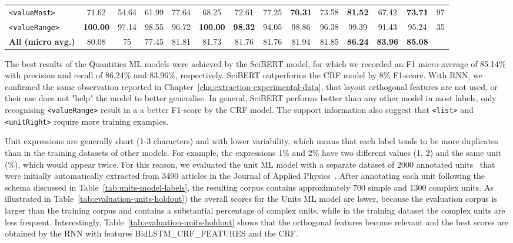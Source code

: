 \begin{table}[htbp]
{\begin{tabular}{l ccc ccc ccc ccc r}
        \texttt{<valueMost>} & 71.62 & 54.64 & 61.99 & 77.64 & 68.25 & 72.61 & 77.25 & \textbf{70.31} & 73.58 & \textbf{81.52} & 67.42 & \textbf{73.71} & 97\\
        \texttt{<valueRange>} & \textbf{100.00} & 97.14 & 98.55 & 96.72 & \textbf{100.00} & \textbf{98.32} & 94.05 & 98.86 & 96.38 & 99.39 & 91.43 & 95.24 & 35\\
        \midrule
        \textbf{All (micro avg.)} & 80.08 & 75 & 77.45 & 81.81 & 81.73 & 81.76 & 81.76 & 81.94 & 81.85 & \textbf{86.24} & \textbf{83.96} & \textbf{85.08} & \\
        \bottomrule
    \end{tabular}
    }
    
    \label{tab:evaluation-quantities-holdout}
\end{table}


The best results of the Quantities ML models were achieved by the SciBERT model, for which we recorded an F1 micro-average of 85.14\% with precision and recall of 86.24\% and 83.96\%, respectively. SciBERT outperforms the CRF model by 8\% F1-score.  
With RNN, we confirmed the same observation reported in Chapter~\ref{cha:extraction-experimental-data}, that layout orthogonal features are not used, or their use does not "help" the model to better generalise. 
In general, SciBERT performs better than any other model in most labels, only recognising \texttt{<valueRange>} result in a a better F1-score by the CRF model. 
The support information also suggest that \texttt{<list>} and \texttt{<unitRight>} require more training examples.

Unit expressions are generally short (1-3 characters) and with lower variability, which means that each label tends to be more duplicates than in the training datasets of other models. 
For example, the expressions 1\% and 2\% have two different values (1, 2) and the same unit (\%), which would appear twice. 
For this reason, we evaluated the unit ML model with a separate dataset of 2000 annotated units~\cite{foppiano2019leveraging} that were initially automatically extracted from 3490 articles in the Journal of Applied Physics~\cite{suzuki2018constructing}.
After annotating each unit following the schema discussed in Table~\ref{tab:units-model-labels}, the resulting corpus contains approximately 700 simple and 1300 complex units. 
As illustrated in Table~\ref{tab:evaluation-units-holdout}) the overall scores for the Units ML model are lower, because the evaluation corpus is larger than the training corpus and contains a substantial percentage of complex units, while in the training dataset the complex units are less frequent.  
Interestingly, Table~\ref{tab:evaluation-units-holdout} shows that the orthogonal features become relevant and the best scores are obtained by the RNN with features BidLSTM\_CRF\_FEATURES and the CRF. 

